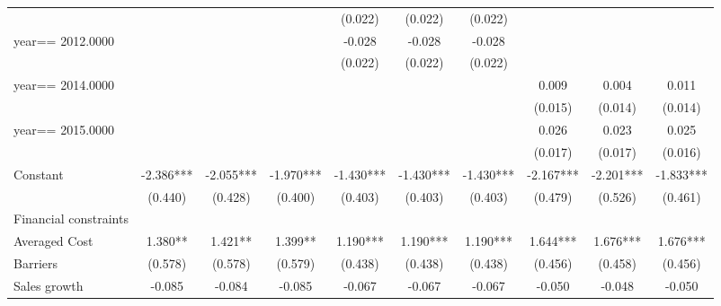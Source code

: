 \begin{table}[htbp]
\begin{tabular}{l*{9}{c}}
                    &               &               &               &     (0.022)   &     (0.022)   &     (0.022)   &               &               &               \\
year==  2012.0000   &               &               &               &      -0.028   &      -0.028   &      -0.028   &               &               &               \\
                    &               &               &               &     (0.022)   &     (0.022)   &     (0.022)   &               &               &               \\
year==  2014.0000   &               &               &               &               &               &               &       0.009   &       0.004   &       0.011   \\
                    &               &               &               &               &               &               &     (0.015)   &     (0.014)   &     (0.014)   \\
year==  2015.0000   &               &               &               &               &               &               &       0.026   &       0.023   &       0.025   \\
                    &               &               &               &               &               &               &     (0.017)   &     (0.017)   &     (0.016)   \\
Constant            &      -2.386***&      -2.055***&      -1.970***&      -1.430***&      -1.430***&      -1.430***&      -2.167***&      -2.201***&      -1.833***\\
                    &     (0.440)   &     (0.428)   &     (0.400)   &     (0.403)   &     (0.403)   &     (0.403)   &     (0.479)   &     (0.526)   &     (0.461)   \\
\hline
Financial constraints&               &               &               &               &               &               &               &               &               \\
Averaged Cost       &       1.380** &       1.421** &       1.399** &       1.190***&       1.190***&       1.190***&       1.644***&       1.676***&       1.676***\\
Barriers            &     (0.578)   &     (0.578)   &     (0.579)   &     (0.438)   &     (0.438)   &     (0.438)   &     (0.456)   &     (0.458)   &     (0.456)   \\
Sales growth        &      -0.085   &      -0.084   &      -0.085   &      -0.067   &      -0.067   &      -0.067   &      -0.050   &      -0.048   &      -0.050   \\

\end{tabular}
\end{table}
